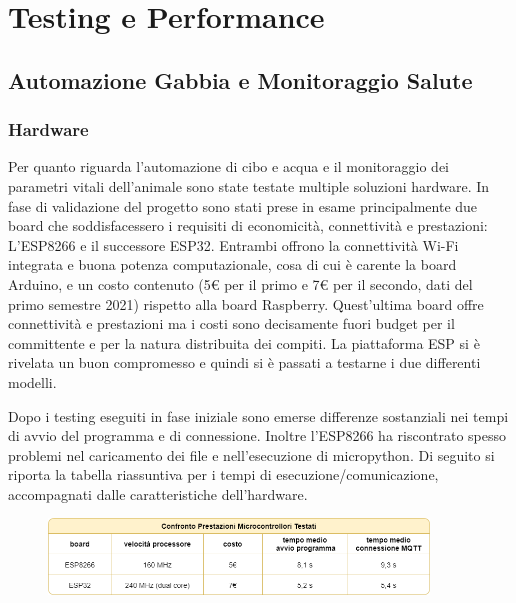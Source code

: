 

\chapter{Testing e Performance}
\section{Automazione Gabbia e Monitoraggio Salute}
\subsection{Hardware}
Per quanto riguarda l'automazione di cibo e acqua e il monitoraggio dei parametri vitali dell'animale sono state testate multiple soluzioni hardware. In fase di validazione del progetto sono stati prese in esame principalmente due board che soddisfacessero i requisiti di economicità, connettività e prestazioni: L'ESP8266 e il successore ESP32. 
Entrambi offrono la connettività Wi-Fi integrata e buona potenza computazionale, cosa di cui è carente la board Arduino, e un costo contenuto (5€ per il primo e 7€ per il secondo, dati del primo semestre 2021) rispetto alla board Raspberry. Quest'ultima board offre connettività e prestazioni ma i costi sono decisamente fuori budget per il committente e per la natura distribuita dei compiti. La piattaforma ESP si è rivelata un buon compromesso e quindi si è passati a testarne i due differenti modelli.

Dopo i testing eseguiti in fase iniziale sono emerse differenze sostanziali nei tempi di avvio del programma e di connessione. Inoltre l'ESP8266 ha riscontrato spesso problemi nel caricamento dei file e nell'esecuzione di micropython. Di seguito si riporta la tabella riassuntiva per i tempi di esecuzione/comunicazione, accompagnati dalle caratteristiche dell'hardware. 

    \begin{figure}[H]
        \centering
        \includegraphics[width=0.9\textwidth]{DrawIo/ConfrontoMicrocontrollori.png}
    \end{figure}


